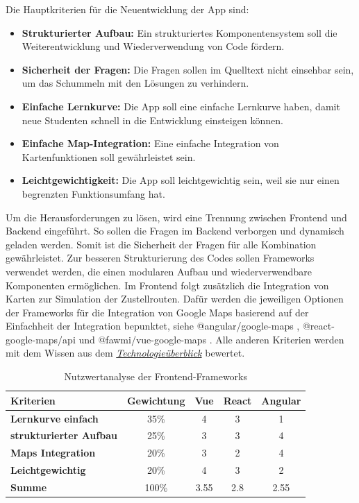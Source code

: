 \documentclass[biblatex]{lni}
\begin{document}
Die Hauptkriterien für die Neuentwicklung der App sind:
\begin{itemize}
  \item \textbf{Strukturierter Aufbau:} Ein strukturiertes Komponentensystem soll die Weiterentwicklung und Wiederverwendung von Code fördern.
  \item \textbf{Sicherheit der Fragen:} Die Fragen sollen im Quelltext nicht einsehbar sein, um das Schummeln mit den Lösungen zu verhindern.
  \item \textbf{Einfache Lernkurve:} Die App soll eine einfache Lernkurve haben, damit neue Studenten schnell in die Entwicklung einsteigen können.
  \item \textbf{Einfache Map-Integration:} Eine einfache Integration von Kartenfunktionen soll gewährleistet sein.
  \item \textbf{Leichtgewichtigkeit:} Die App soll leichtgewichtig sein, weil sie nur einen begrenzten Funktionsumfang hat.
\end{itemize}

Um die Herausforderungen zu lösen, wird eine Trennung zwischen Frontend und Backend eingeführt.
So sollen die Fragen im Backend verborgen und dynamisch geladen werden.
Somit ist die Sicherheit der Fragen für alle Kombination gewährleistet.
Zur besseren Strukturierung des Codes sollen Frameworks verwendet werden, die einen modularen Aufbau und wiederverwendbare Komponenten ermöglichen.
Im Frontend folgt zusätzlich die Integration von Karten zur Simulation der Zustellrouten.
Dafür werden die jeweiligen Optionen der Frameworks für die Integration von Google Maps basierend auf der Einfachheit der Integration bepunktet,
siehe @angular/google-maps \cite{ngMaps}, @react-google-maps/api \cite{rctMaps} und @fawmi/vue-google-maps \cite{vueMaps}.
Alle anderen Kriterien werden mit dem Wissen aus dem \hyperref[sec:tec-überblick]{\textit{Technologieüberblick}} bewertet.

\begin{table}[h!]
  \centering
  \caption{Nutzwertanalyse der Frontend-Frameworks}
  \label{tab:nutz-frontend}
  \begin{tabular}{@{}lcccc@{}}
    \toprule
    \textbf{Kriterien} & \textbf{Gewichtung} & \textbf{Vue} & \textbf{React} & \textbf{Angular} \\ \midrule
    \textbf{Lernkurve einfach} & 35\% & 4 & 3 & 1 \\ \midrule
    \textbf{strukturierter Aufbau} & 25\% & 3 & 3 & 4 \\ \midrule
    \textbf{Maps Integration} & 20\% & 3 & 2 & 4 \\ \midrule
    \textbf{Leichtgewichtig} & 20\% & 4 & 3 & 2 \\ \midrule
    \textbf{Summe} & 100\% & 3.55 & 2.8 & 2.55 \\ \bottomrule
  \end{tabular}
\end{table}
\end{document}
